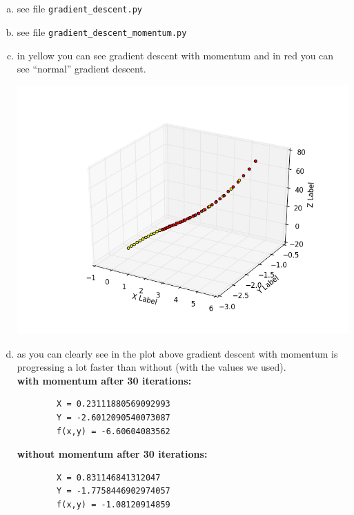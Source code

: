 \documentclass[12pt]{article}
\begin{document}
\subsection{ }
\begin{enumerate}[a)]
    \item 
        see file \verb!gradient_descent.py!

    \item
        see file \verb!gradient_descent_momentum.py!

    \item
        in yellow you can see gradient descent with momentum and in red you can see ``normal'' gradient descent.\\
        \begin{center}
            \includegraphics[scale = 0.8]{pictures/figure_1}\\
        \end{center}

    \item
        as you can clearly see in the plot above gradient descent with momentum is progressing a lot faster than without (with the values we used).\\

        \textbf{with momentum after 30 iterations:}
        \begin{verbatim}
        X = 0.23111880569092993
        Y = -2.6012090540073087
        f(x,y) = -6.60604083562
        \end{verbatim}

        \textbf{without momentum after 30 iterations:}
        \begin{verbatim}
        X = 0.831146841312047
        Y = -1.7758446902974057
        f(x,y) = -1.08120914859
        \end{verbatim}


\end{enumerate}
\end{document}
